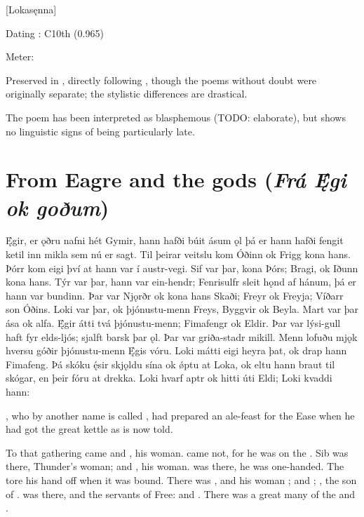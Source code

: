 [Lokasęnna]

\begin{flushright}%
Dating \parencite{Sapp2022}: C10th (0.965)

Meter: \Ljodahattr%
\end{flushright}

Preserved in \Regius, directly following \Hymiskvida, though the poems without doubt were originally separate; the stylistic differences are drastical.

The poem has been interpreted as blasphemous (TODO: elaborate), but shows no linguistic signs of being particularly late.

\sectionline

\section{From Eagre and the gods (\emph{Frá Ę́gi ok goðum})}

\bpg\bpa Ę́gir, er ǫðru nafni hét Gymir, hann hafði búit ásum ǫl þá er hann hafði fengit ketil inn mikla sem nú er sagt. Til þeirar veitslu kom Óðinn ok Frigg kona hans. Þórr kom eigi því at hann var í austr-vegi. Sif var þar, kona Þórs; Bragi, ok Iðunn kona hans. Týr var þar, hann var ein-hendr; Fenrisulfr sleit hǫnd af hánum, þá er hann var bundinn. Þar var Njǫrðr ok kona hans Skaði; Freyr ok Freyja; Víðarr son Óðins. Loki var þar, ok þjónustu-menn Freys, Byggvir ok Beyla. Mart var þar ása ok alfa. Ę́gir átti tvá þjónustu-menn; Fimafengr ok Eldir. Þar var lýsi-gull haft fyr elds-ljós; sjalft barsk þar ǫl. Þar var griða-stadr mikill. Menn lofuðu mjǫk hversu góðir þjónustu-menn Ę́gis vóru. Loki mátti eigi heyra þat, ok drap hann Fimafeng. Þá skóku ę́sir skjǫldu sína ok ǿptu at Loka, ok eltu hann braut til skógar, en þeir fóru at drekka. Loki hvarf aptr ok hitti úti Eldi; Loki kvaddi hann:\epa

\bpb {}, who by another name is called , had prepared an ale-feast for the Ease when he had got the great kettle as is now told.

To that gathering came  and , his woman.  came not, for he was on the . Sib was there, Thunder’s woman;  and , his woman.  was there, he was one-handed. The  tore his hand off when it was bound. There was , and his woman ;  and ; , the son of .  was there, and the servants of Free:  and . There was a great many of the  and .

